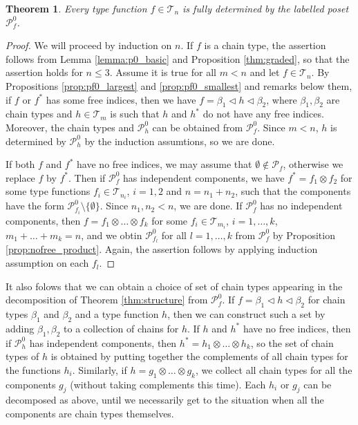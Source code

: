 \documentclass[12pt]{article}
\newtheorem{theorem}{Theorem}
\theoremstyle{definition}
\theoremstyle{remark}
\def\Te{\mathcal T}
\def\Pe{\mathcal P}
\def\vtl{\vartriangleleft}
\begin{document}
\begin{theorem}\label{thm:pf0} Every type function $f\in \Te_n$ is fully determined by the
labelled poset $\Pe_f^0$.  

\end{theorem}

\begin{proof}  We will proceed by induction on
$n$. If $f$ is a chain type, the assertion follows from Lemma
\ref{lemma:p0_basic} and Proposition \ref{thm:graded}, so that the assertion holds for
$n\le 3$. Assume it is true for all $m<n$ and let $f\in \Te_n$. By Propositions
\ref{prop:pf0_largest} and \ref{prop:pf0_smallest} and remarks below them, if $f$ or
$f^*$ has
some free indices, then we have $f=\beta_1\vtl h \vtl \beta_2$, where $\beta_1,\beta_2$
are chain types and $h\in \Te_m$ is such that $h$ and $h^*$ do not have any free indices.
Moreover,  the chain types and $\Pe_h^0$ 
 can be obtained from $\Pe_f^0$. Since $m<n$,  $h$ is
 determined by $\Pe_h^0$ by the induction assumtions, so we are done.


If both $f$ and $f^*$ have no free indices, we may assume that $\emptyset \notin \Pe_f$, otherwise we 
replace $f$ by $f^*$. Then if $\Pe_f^0$ has independent components, we have
$f^*=f_1\otimes f_2$ for some type functions $f_i\in \Te_{n_i}$, $i=1,2$ and $n=n_1+n_2$,
such that the components have the form $\Pe_{f_i}^0\setminus \{\emptyset\}$. Since
$n_1,n_2<n$, we are done. If $\Pe_f^0$ has no independent components, then
$f=f_1\otimes\dots \otimes f_k$ for some $f_i\in \Te_{m_i}$, $i=1,\dots,k$, $m_1+\dots
+m_k=n$, and we obtin   $\Pe_{f_l}^0$ for all $l=1,\dots,k$ from $\Pe_f^0$ by Proposition
\ref{prop:nofree_product}. Again, the assertion follows by applying induction assumption
on each $f_l$.


\end{proof}


It also folows that we can obtain a choice of set of chain types  appearing in the decomposition
of Theorem \ref{thm:structure} from $\Pe_f^0$.	If $f=\beta_1\vtl h\vtl \beta_2$ for chain
types $\beta_1$ and $\beta_2$ and a type function $h$, then we can construct such a set
by adding $\beta_1,\beta_2$ to a collection of chains for $h$. If $h$ and $h^*$ 
have no free indices, then if $\Pe_h^0$ has independent components, then $h^*=h_1\otimes\dots \otimes h_k$, so the set of chain types of $h$ is obtained by putting
together the complements of all chain types for the functions $h_i$. Similarly, if
$h=g_1\otimes \dots\otimes g_k$, we collect all chain types for all the components $g_j$ (without taking 
complements this time). Each $h_i$ or $g_j$ can be decomposed as above, until we
necessarily get to the situation when all the components are chain types themselves.
\end{document}
